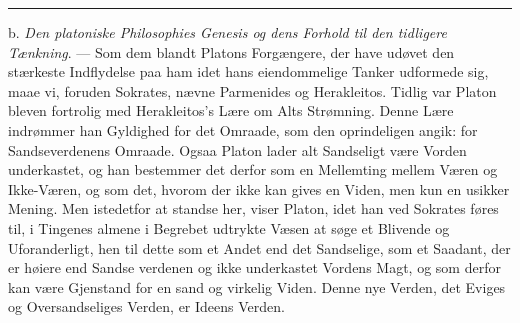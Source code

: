 \documentclass[12pt,a4paper]{book}
\newcommand{\divrule}{\begin{center}\rule{2cm}{0.4pt}\end{center}}
\begin{document}
\divrule
b. \emph{Den platoniske Philosophies Genesis og dens
Forhold til den tidligere Tænkning}. --- Som dem blandt
Platons Forgængere, der have udøvet den stærkeste Indflydelse
paa ham idet hans eiendommelige Tanker udformede sig, maae
vi, foruden Sokrates, nævne Parmenides og Herakleitos. Tidlig
var Platon bleven fortrolig med Herakleitos's Lære om Alts
Strømning. Denne Lære indrømmer han Gyldighed for det
Omraade, som den oprindeligen angik: for Sandseverdenens
Omraade. Ogsaa Platon lader alt Sandseligt være Vorden
underkastet, og han bestemmer det derfor som en Mellemting
mellem Væren og Ikke-Væren, og som det, hvorom der ikke
kan gives en Viden, men kun en usikker Mening. Men
istedetfor at standse her, viser Platon, idet han ved Sokrates
føres til, i Tingenes almene i Begrebet udtrykte Væsen at
søge et Blivende og Uforanderligt, hen til dette som et Andet
end det Sandselige, som et Saadant, der er høiere end Sandse\-%
verdenen og ikke underkastet Vordens Magt, og som derfor
kan være Gjenstand for en sand og virkelig Viden. Denne
nye Verden, det Eviges og Oversandseliges Verden, er Ideens
Verden.
\end{document}
